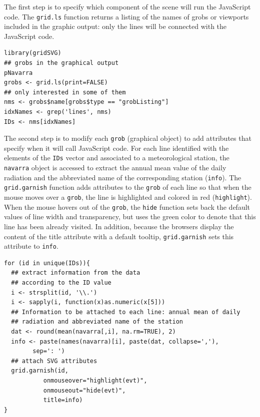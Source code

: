 The first step is to specify which component of the scene
will run the JavaScript code. The \texttt{grid.ls} function  returns a
listing of the names of grobs or viewports included in the graphic
output: only the lines will be connected with the JavaScript
code. 


\lstset{language=R,numbers=none}
\begin{lstlisting}
library(gridSVG)
## grobs in the graphical output
pNavarra
grobs <- grid.ls(print=FALSE)
## only interested in some of them
nms <- grobs$name[grobs$type == "grobListing"]
idxNames <- grep('lines', nms)
IDs <- nms[idxNames]
\end{lstlisting}

The second step is to modify each \texttt{grob} (graphical object) to add
attributes that specify when it will call JavaScript code. For each
line identified with the elements of the \texttt{IDs} vector and associated
to a meteorological station, the \texttt{navarra} object is accessed to
extract the annual mean value of the daily radiation and the
abbreviated name of the corresponding station (\texttt{info}).  The
\texttt{grid.garnish} function adds attributes to the \texttt{grob} of each line so
that when the mouse moves over a \texttt{grob}, the line is highlighted and
colored in red (\texttt{highlight}). When the mouse hovers out of the \texttt{grob},
the \texttt{hide} function sets back the default values of line width and
transparency, but uses the green color to denote that this line has
been already visited. In addition, because the browsers display the
content of the title attribute with a default tooltip, \texttt{grid.garnish}
sets this attribute to \texttt{info}.


\lstset{language=R,numbers=none}
\begin{lstlisting}
for (id in unique(IDs)){
  ## extract information from the data
  ## according to the ID value
  i <- strsplit(id, '\\.')
  i <- sapply(i, function(x)as.numeric(x[5]))
  ## Information to be attached to each line: annual mean of daily
  ## radiation and abbreviated name of the station
  dat <- round(mean(navarra[,i], na.rm=TRUE), 2)
  info <- paste(names(navarra)[i], paste(dat, collapse=','),
		sep=': ')
  ## attach SVG attributes
  grid.garnish(id,
	       onmouseover="highlight(evt)",
	       onmouseout="hide(evt)",
	       title=info)
}
\end{lstlisting}

